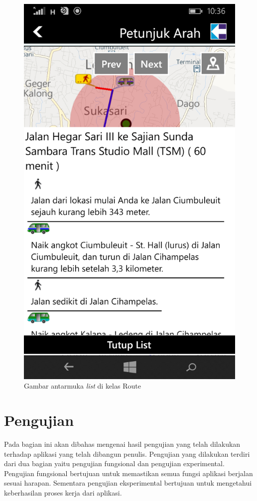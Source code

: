 	\begin{figure}[!h]
		\centering
			\includegraphics[scale=0.2]{Gambar/antarmuka/list_route}
		\caption{Gambar antarmuka \textit{list} di kelas Route}
		\label{fig:antarmuka list Route}
	\end{figure}

\newpage

\section{Pengujian}
\label{lab:Pengujian}
\hspace{0.5cm} Pada bagian ini akan dibahas mengenai hasil pengujian yang telah dilakukan terhadap aplikasi yang telah dibangun penulis. Pengujian yang dilakukan terdiri dari dua bagian yaitu pengujian fungsional dan pengujian experimental. Pengujian fungsional bertujuan untuk memastikan semua fungsi aplikasi berjalan sesuai harapan. Sementara pengujian eksperimental bertujuan untuk mengetahui keberhasilan proses kerja dari aplikasi.

